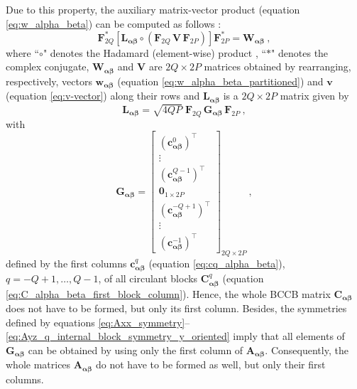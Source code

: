 \documentclass[manuscript,noblind]{geophysics}
\begin{document}
Due to this property, the auxiliary matrix-vector product (equation \ref{eq:w_alpha_beta}) 
can be computed as follows \citep{takahashi2020convolutional}:
\begin{equation}
	\mathbf{F}_{2Q}^{\ast} \left[ 
	\mathbf{L}_{\boldsymbol{\alpha\beta}} \circ \left(\mathbf{F}_{2Q} \, \mathbf{V} \, \mathbf{F}_{2P} \right) 
	\right] \mathbf{F}_{2P}^{\ast} = \mathbf{W}_{\boldsymbol{\alpha\beta}} \: ,
	\label{eq:2d-discrete-convolution}
\end{equation}
where ``$\circ$" denotes the Hadamard (element-wise) product \citep[e.g.,][ p. 298]{horn_johnson1991},
``$\ast$" denotes the complex conjugate, 
$\mathbf{W}_{\boldsymbol{\alpha\beta}}$ and $\mathbf{V}$ are $2Q \times 2P$ matrices obtained
by rearranging, respectively, vectors $\mathbf{w}_{\boldsymbol{\alpha\beta}}$ 
(equation \ref{eq:w_alpha_beta_partitioned}) and $\mathbf{v}$ (equation \ref{eq:v-vector})
along their rows and $\mathbf{L}_{\boldsymbol{\alpha\beta}}$ is a $2Q \times 2P$ matrix
given by
\begin{equation}
	\mathbf{L}_{\boldsymbol{\alpha\beta}} = \sqrt{4QP} \; 
	\mathbf{F}_{2Q} \, \mathbf{G}_{\boldsymbol{\alpha\beta}} \, \mathbf{F}_{2P} \: ,
	\label{eq:L_alpha_beta}
\end{equation}
with
\begin{equation}
	\mathbf{G}_{\boldsymbol{\alpha\beta}} = \begin{bmatrix}
		\left( \mathbf{c}_{\boldsymbol{\alpha\beta}}^{0} \right)^{\top} \\
		\vdots \\
		\left( \mathbf{c}_{\boldsymbol{\alpha\beta}}^{Q-1} \right)^{\top} \\
		\mathbf{0}_{1 \times 2P} \\
		\left( \mathbf{c}_{\boldsymbol{\alpha\beta}}^{-Q+1} \right)^{\top} \\
		\vdots \\
		\left( \mathbf{c}_{\boldsymbol{\alpha\beta}}^{-1} \right)^{\top}
	\end{bmatrix}_{2Q \times 2P} \: ,
	\label{eq:G_alpha_beta}
\end{equation}
defined by the first columns $\mathbf{c}_{\boldsymbol{\alpha\beta}}^{q}$ 
(equation \ref{eq:cq_alpha_beta}), $q = -Q+1, \dots, Q-1$, of all circulant blocks
$\mathbf{C}_{\boldsymbol{\alpha\beta}}^{q}$ (equation \ref{eq:C_alpha_beta_first_block_column}).
Hence, the whole BCCB matrix $\mathbf{C}_{\boldsymbol{\alpha\beta}}$ does not have to be
formed, but only its first column. 
Besides, the symmetries defined by equations 
\ref{eq:Axx_symmetry}--\ref{eq:Ayz_q_internal_block_symmetry_y_oriented} imply
that all elements of $\mathbf{G}_{\boldsymbol{\alpha\beta}}$ can be obtained by 
using only the first column of $\mathbf{A_{\boldsymbol{\alpha\beta}}}$. Consequently, 
the whole matrices $\mathbf{A_{\boldsymbol{\alpha\beta}}}$ do not have to be formed
as well, but only their first columns.
\end{document}
